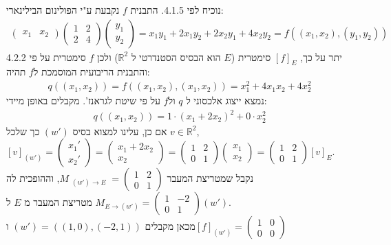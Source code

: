\documentclass{article}
\def\reals{\mathbb{R}}
\DeclareMathOperator{\inv}{^{-1}}
\begin{document}
נוכיח לפי 4.1.5. התבנית $f$ נקבעת ע"י הפולינום הבילינארי:
\begin{align*}
    \begin{pmatrix}
        x_1 & x_2
    \end{pmatrix} \begin{pmatrix}
                      1 & 2 \\
                      2 & 4
                  \end{pmatrix} \begin{pmatrix}
                                    y_1 \\
                                    y_2
                                \end{pmatrix}=
    x_1y_1 + 2x_1y_2+2x_2y_1+4x_2y_2=f((x_1, x_2), (y_1, y_2))
\end{align*}
יתר על כך, $[f]_E$ סימטרית ($E$ הוא הבסיס הסטנדרטי ל $\reals^2$) ולכן $f$ סימטרית על פי 4.2.2 והתבנית הריבועית המוסמכת ל$f$ תהיה:
\begin{align*}
    q((x_1, x_2))=f((x_1, x_2), (x_1, x_2))=x_1^2+4x_1x_2+4x_2^2
\end{align*}
נמצא ייצוג אלכסוני ל $q$ ול$f$ על פי שיטת לגראנז'. מקבלים באופן מיידי:
\begin{align*}
    q((x_1, x_2))=1\cdot (x_1+2x_2)^2 + 0 \cdot x_2^2
\end{align*}
אם כן, עלינו למצוא בסיס $(w')$ כך שלכל $v\in \reals^2$, $[v]_{(w')}=\begin{pmatrix}
        x_1' \\
        x_2'
    \end{pmatrix}=\begin{pmatrix}
        x_1+2x_2 \\
        x_2
    \end{pmatrix}=\begin{pmatrix}
        1 & 2 \\
        0 & 1
    \end{pmatrix}\begin{pmatrix}
        x_1 \\
        x_2
    \end{pmatrix}=\begin{pmatrix}
        1 & 2 \\
        0 & 1
    \end{pmatrix}[v]_E
$. \\
נקבל שמטריצת המעבר $M\inv_{(w')\rightarrow E}=\begin{pmatrix}
        1 & 2 \\
        0 & 1
    \end{pmatrix}$, וההופכית לה $M_{E\rightarrow (w')}=\begin{pmatrix}
        1 & -2 \\
        0 & 1
    \end{pmatrix}$ מטריצת המעבר מ $E$ ל$(w')$.\\
מכאן מקבלים $(w')=((1,0), (-2,1))$ ו$[f]_{(w')}=\begin{pmatrix}
        1 & 0 \\
        0 & 0
    \end{pmatrix}$
\end{document}
